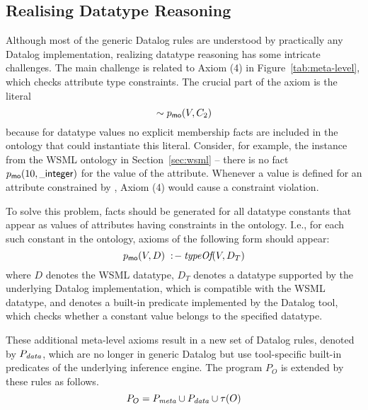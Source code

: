 \def\dataaxioms{\ensuremath{P_{\smtxtit{data}}}\xspace}
\def\transdpred{\transtxt{dpred}}

\subsection{Realising Datatype Reasoning}
\label{sec:datatype_reasoning} Although most of the generic
Datalog rules are understood by practically any Datalog
implementation, realizing datatype reasoning has some intricate
challenges. The main challenge is related to Axiom (4) in
Figure~\ref{tab:meta-level}, which checks attribute type
constraints. The crucial part of the axiom is the literal
\[\sim p_{\mathrm{\sf mo}}(V,C_2)\] because for datatype values no explicit
membership facts are included in the ontology that could
instantiate this literal. Consider, for example, the instance
 from the WSML ontology in
Section~\ref{sec:wsml} -- there is no fact
$\pmo(10,\wsmlname{\_integer})$ for the value of the
 attribute. Whenever a value is
defined for an attribute constrained by , Axiom (4)
would cause a constraint violation.

To solve this problem, \pmo facts should be generated for all
datatype constants that appear as values of attributes having
 constraints in the ontology. I.e., for each such
constant in the ontology, axioms of the following form should
appear: \compress
\begin{displaymath}
    \pmo(V,D) \lprl \typeof(V, D_T) \compress
\end{displaymath}
where $D$ denotes the WSML datatype, $D_T$ denotes a datatype
supported by the underlying Datalog implementation, which is
compatible with the WSML datatype, and \typeof denotes a built-in
predicate implemented by the Datalog tool, which checks whether a
constant value belongs to the specified datatype.

These additional meta-level axioms result in a new set of Datalog
rules, denoted by \dataaxioms, which are no longer in generic
Datalog but use tool-specific built-in predicates of the
underlying inference engine. The program $P_O$ is extended by
these rules as follows. \compress
\begin{displaymath}
    P_O = \mlaxioms \cup \dataaxioms \cup \tau(O)
\end{displaymath}

